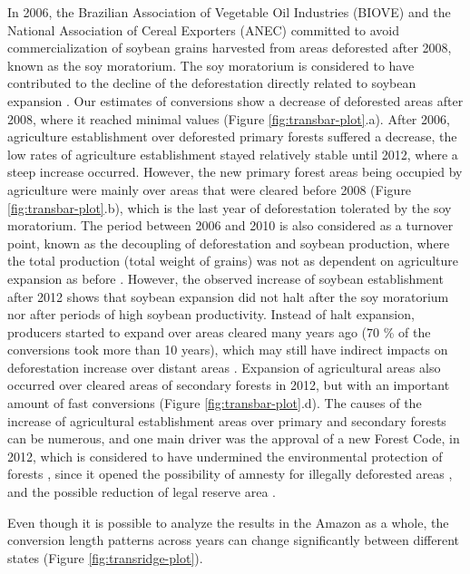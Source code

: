 \documentclass[essd, manuscript]{copernicus}
\begin{document}
In 2006, the Brazilian Association of Vegetable Oil Industries (BIOVE) and the National Association of Cereal Exporters (ANEC) committed to avoid commercialization of soybean grains harvested from areas deforested after 2008, known as the soy moratorium.
The soy moratorium is considered to have contributed to the decline of the deforestation directly related to soybean expansion \citep{Paim2021, Amaral2021, Heilmayr2020, Kastens2017}.
Our estimates of conversions show a decrease of deforested areas after 2008, where it reached minimal values (Figure \ref{fig:transbar-plot}.a).
After 2006, agriculture establishment over deforested primary forests suffered a decrease, the low rates of agriculture establishment stayed relatively stable until 2012, where a steep increase occurred.
However, the new primary forest areas being occupied by agriculture were mainly over areas that were cleared before 2008 (Figure \ref{fig:transbar-plot}.b), which is the last year of deforestation tolerated by the soy moratorium.
The period between 2006 and 2010 is also considered as a turnover point, known as the decoupling of deforestation and soybean production, where the total production (total weight of grains) was not as dependent on agriculture expansion as before \citep{Macedo2012}.
However, the observed increase of soybean establishment after 2012 shows that soybean expansion did not halt after the soy moratorium nor after periods of high soybean productivity.
Instead of halt expansion, producers started to expand over areas cleared many years ago (70 \% of the conversions took more than 10 years), which may still have indirect impacts on deforestation increase over distant areas \citep{Arima2011, Gollnow2018, Silva2021}.
Expansion of agricultural areas also occurred over cleared areas of secondary forests in 2012, but with an important amount of fast conversions (Figure \ref{fig:transbar-plot}.d).
The causes of the increase of agricultural establishment areas over primary and secondary forests can be numerous, and one main driver was the approval of a new Forest Code, in 2012, which is considered to have undermined the environmental protection of forests \citep{Kroger2017, Pereira2019}, since it opened the possibility of amnesty for illegally deforested areas \citep{Schielein2018, Santanna2021, Filho2014}, and the possible reduction of legal reserve area \citep{Freitas2018}.

Even though it is possible to analyze the results in the Amazon as a whole, the conversion length patterns across years can change significantly between different states (Figure \ref{fig:transridge-plot}).
\end{document}
